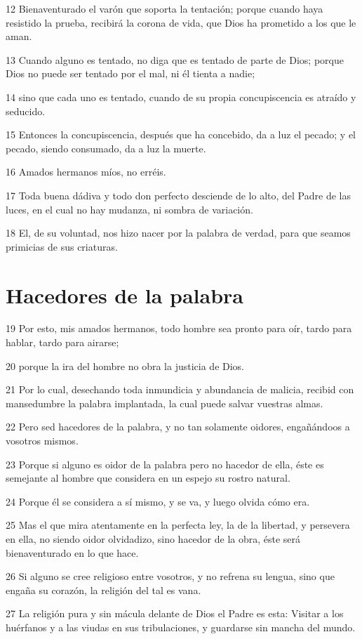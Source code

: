 \par 12 Bienaventurado el varón que soporta la tentación; porque cuando haya resistido la prueba, recibirá la corona de vida, que Dios ha prometido a los que le aman.
\par 13 Cuando alguno es tentado, no diga que es tentado de parte de Dios; porque Dios no puede ser tentado por el mal, ni él tienta a nadie;
\par 14 sino que cada uno es tentado, cuando de su propia concupiscencia es atraído y seducido.
\par 15 Entonces la concupiscencia, después que ha concebido, da a luz el pecado; y el pecado, siendo consumado, da a luz la muerte.
\par 16 Amados hermanos míos, no erréis.
\par 17 Toda buena dádiva y todo don perfecto desciende de lo alto, del Padre de las luces, en el cual no hay mudanza, ni sombra de variación.
\par 18 El, de su voluntad, nos hizo nacer por la palabra de verdad, para que seamos primicias de sus criaturas.

\section*{Hacedores de la palabra}

\par 19 Por esto, mis amados hermanos, todo hombre sea pronto para oír, tardo para hablar, tardo para airarse;
\par 20 porque la ira del hombre no obra la justicia de Dios.
\par 21 Por lo cual, desechando toda inmundicia y abundancia de malicia, recibid con mansedumbre la palabra implantada, la cual puede salvar vuestras almas.
\par 22 Pero sed hacedores de la palabra, y no tan solamente oidores, engañándoos a vosotros mismos.
\par 23 Porque si alguno es oidor de la palabra pero no hacedor de ella, éste es semejante al hombre que considera en un espejo su rostro natural.
\par 24 Porque él se considera a sí mismo, y se va, y luego olvida cómo era.
\par 25 Mas el que mira atentamente en la perfecta ley, la de la libertad, y persevera en ella, no siendo oidor olvidadizo, sino hacedor de la obra, éste será bienaventurado en lo que hace.
\par 26 Si alguno se cree religioso entre vosotros, y no refrena su lengua, sino que engaña su corazón, la religión del tal es vana.
\par 27 La religión pura y sin mácula delante de Dios el Padre es esta: Visitar a los huérfanos y a las viudas en sus tribulaciones, y guardarse sin mancha del mundo.

